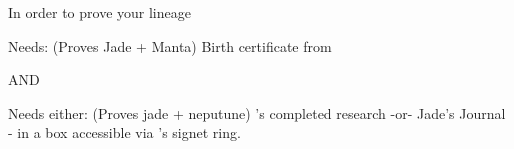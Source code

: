 \documentclass[green]{NeptuneBall}
\begin{document}
\name{\gLineage{}}

In order to prove your lineage 

Needs:  (Proves Jade + Manta)
Birth certificate from \cDiplomat{}


AND

Needs either: (Proves jade + neputune)
\cSpy{}'s completed research
-or-
Jade's Journal - in a box accessible via \cPrince{}'s signet ring.
\end{document}
